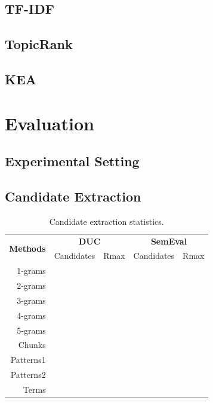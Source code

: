  \subsection{TF-IDF}
  \label{subsec:tfidf}
  \subsection{TopicRank}
  \label{subsec:topicrank}
  \subsection{KEA}
  \label{subsec:kea}

\section{Evaluation}
\label{sec:evaluation}

  \subsection{Experimental Setting}
  \label{subsec:experimental_setting}

  \subsection{Candidate Extraction}
  \label{subsec:candidate_extraction}

    \begin{table}[h]
      \centering
      \begin{tabular}{@{~}r@{~~}c@{~~}c@{~~}c@{~~}c@{~}}
        \toprule
        \multirow{2}{*}[-2pt]{\textbf{Methods}} & \multicolumn{2}{c}{\textbf{DUC}} & \multicolumn{2}{c}{\textbf{SemEval}}\\
        \cmidrule(r){2-3}\cmidrule{4-5}
        & Candidates & Rmax & Candidates & Rmax\\
        \midrule
        1-grams\\
        2-grams\\
        3-grams\\
        4-grams\\
        5-grams\\
        Chunks\\
        Patterns1\\
        Patterns2\\
        Terms\\
        \bottomrule
      \end{tabular}
      \caption{Candidate extraction statistics.
               \label{tab:candidate_extraction_statistics}}
    \end{table}

